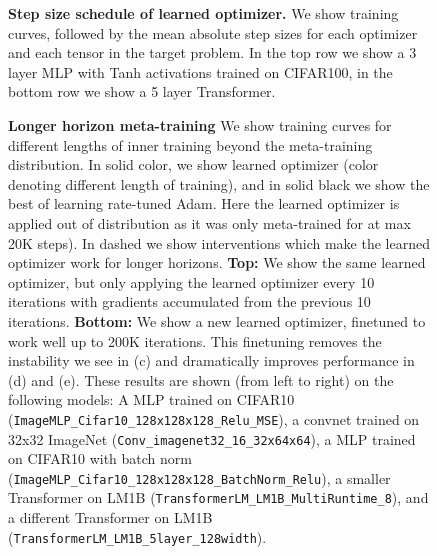 \documentclass[11pt]{article}
\begin{document}
\begin{figure}[t!]
    \centering
    \caption{\textbf{Step size schedule of learned optimizer.} We show training curves, followed by the mean absolute step sizes for each optimizer and each tensor in the target problem. In the top row we show a 3 layer MLP with Tanh activations trained on CIFAR100, in the bottom row we show a 5 layer Transformer.
    \label{fig:step_size}
    }
\end{figure}


\begin{figure}[t!]
    \centering
    \caption{\textbf{Longer horizon meta-training} We show training curves for different lengths of inner training beyond the meta-training distribution.
    In solid color, we show learned optimizer (color denoting different length of training), and in solid black we show the best of learning rate-tuned Adam. Here the learned optimizer is applied out of distribution as it was only meta-trained for at max 20K steps).
    In dashed we show interventions which make the learned optimizer work for longer horizons.
    \textbf{Top:} We show the same learned optimizer, but only applying the learned optimizer every 10 iterations with gradients accumulated from the previous 10 iterations.
    \textbf{Bottom:} We show a new learned optimizer, finetuned to work well up to 200K iterations. This finetuning removes the instability we see in (c) and dramatically improves performance in (d) and (e).
    These results are shown (from left to right) on the following models:
    A MLP trained on CIFAR10 (\texttt{ImageMLP\_Cifar10\_128x128x128\_Relu\_MSE}),
    a convnet trained on 32x32 ImageNet (\texttt{Conv\_imagenet32\_16\_32x64x64}),
    a MLP trained on CIFAR10 with batch norm (\texttt{ImageMLP\_Cifar10\_128x128x128\_BatchNorm\_Relu}),
    a smaller Transformer on LM1B (\texttt{TransformerLM\_LM1B\_MultiRuntime\_8}),
    and a different Transformer on LM1B (\texttt{TransformerLM\_LM1B\_5layer\_128width}).
    \label{fig:num_step_aware_longer}
    }
\end{figure}
\end{document}
